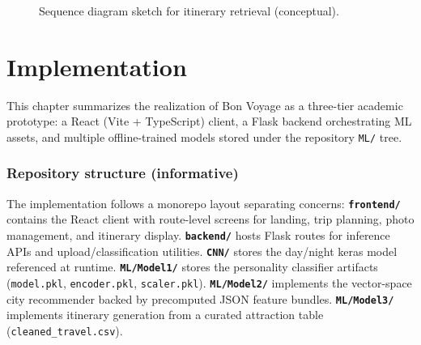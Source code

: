 \documentclass[12pt,oneside,openany]{report}
\begin{document}
\begin{figure}[H]
\centering
{}
\caption{Sequence diagram sketch for itinerary retrieval (conceptual).}
\label{fig:seq}
\end{figure}

\chapter{Implementation}

This chapter summarizes the realization of Bon Voyage as a three-tier academic prototype: a React (Vite + TypeScript) client, a Flask backend orchestrating ML assets, and multiple offline-trained models stored under the repository \texttt{ML/} tree.

\subsection*{Repository structure (informative)}
The implementation follows a monorepo layout separating concerns:
\textbf{\texttt{frontend/}} contains the React client with route-level screens for landing, trip planning, photo management, and itinerary display.
\textbf{\texttt{backend/}} hosts Flask routes for inference APIs and upload/classification utilities.
\textbf{\texttt{CNN/}} stores the day/night keras model referenced at runtime.
\textbf{\texttt{ML/Model1/}} stores the personality classifier artifacts (\texttt{model.pkl}, \texttt{encoder.pkl}, \texttt{scaler.pkl}).
\textbf{\texttt{ML/Model2/}} implements the vector-space city recommender backed by precomputed JSON feature bundles.
\textbf{\texttt{ML/Model3/}} implements itinerary generation from a curated attraction table (\texttt{cleaned\_travel.csv}).
\end{document}
